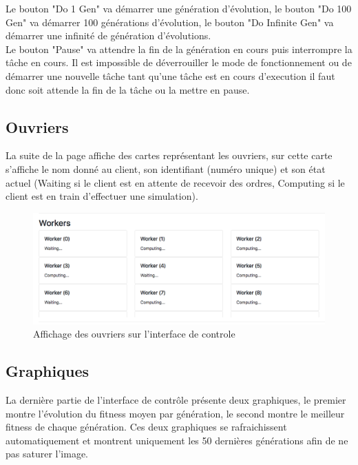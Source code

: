 \documentclass{article}
\begin{document}
Le bouton "Do 1 Gen" va démarrer une génération d'évolution, le bouton "Do 100 Gen" va démarrer 100 générations d'évolution, le bouton "Do Infinite Gen" va démarrer une infinité de génération d'évolutions.\\

Le bouton "Pause" va attendre la fin de la génération en cours puis interrompre la tâche en cours. Il est impossible de déverrouiller le mode de fonctionnement ou de démarrer une nouvelle tâche tant qu'une tâche est en cours d'execution il faut donc soit attende la fin de la tâche ou la mettre en pause.

\subsection{Ouvriers}

La suite de la page affiche des cartes représentant les ouvriers, sur cette carte s'affiche le nom donné au client, son identifiant (numéro unique) et son état actuel (Waiting si le client est en attente de recevoir des ordres, Computing si le client est en train d'effectuer une simulation).

\begin{figure}[H]
\begin{center}
	\includegraphics[scale=0.4]{workers.png} 
	\caption{Affichage des ouvriers sur l'interface de controle}
\end{center}
\end{figure}


\subsection{Graphiques}

La dernière partie de l'interface de contrôle présente deux graphiques, le premier montre l'évolution du fitness moyen par génération, le second montre le meilleur fitness de chaque génération. Ces deux graphiques se rafraichissent automatiquement et montrent uniquement les 50 dernières générations afin de ne pas saturer l'image.
\end{document}
